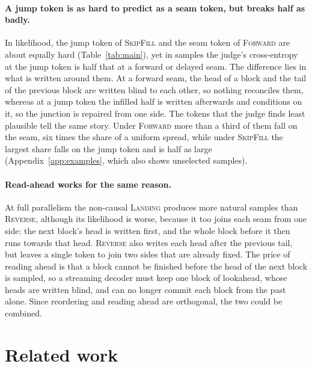 \documentclass{article}
\theoremstyle{definition}
\theoremstyle{remark}
\newcommand{\name}[1]{\textup{\textsc{#1}}}
\newcommand{\sfill}{\name{SkipFill}\xspace}
\newcommand{\rev}{\name{Reverse}\xspace}
\newcommand{\fwd}{\name{Forward}\xspace}
\newcommand{\landing}{\name{Landing}\xspace}
\begin{document}
\paragraph{A jump token is as hard to predict as a seam token, but breaks half as badly.}
In likelihood, the jump token of \sfill and the seam token of \fwd are about equally hard (Table~\ref{tab:main}), yet in samples the judge's cross-entropy at the jump token is half that at a forward or delayed seam.
The difference lies in what is written around them.
At a forward seam, the head of a block and the tail of the previous block are written blind to each other, so nothing reconciles them, whereas at a jump token the infilled half is written afterwards and conditions on it, so the junction is repaired from one side.
The tokens that the judge finds least plausible tell the same story.
Under \fwd more than a third of them fall on the seam, six times the share of a uniform spread, while under \sfill the largest share falls on the jump token and is half as large (Appendix~\ref{app:examples}, which also shows unselected samples).

\paragraph{Read-ahead works for the same reason.}
At full parallelism the non-causal \landing produces more natural samples than \rev, although its likelihood is worse, because it too joins each seam from one side: the next block's head is written first, and the whole block before it then runs towards that head.
\rev also writes each head after the previous tail, but leaves a single token to join two sides that are already fixed.
The price of reading ahead is that a block cannot be finished before the head of the next block is sampled, so a streaming decoder must keep one block of lookahead, whose heads are written blind, and can no longer commit each block from the past alone.
Since reordering and reading ahead are orthogonal, the two could be combined.

\section{Related work}
\label{sec:related}
\end{document}
